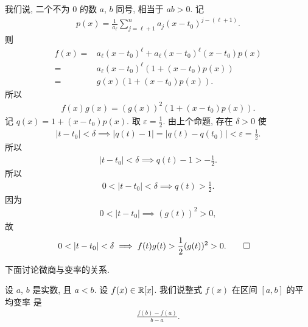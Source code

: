 \begin{pf}
    我们说, 二个不为 $0$ 的数 $a$, $b$ 同号, 相当于 $ab > 0$. 记
    \begin{align*}
        p(x) = \frac{1}{a_\ell} \sum_{j = \ell + 1}^{n} a_j (x - t_0)^{j - (\ell + 1)}.
    \end{align*}
    则
    \begin{align*}
        f(x)
        = {} & a_\ell (x - t_0)^\ell + a_\ell (x - t_0)^{\ell} (x - t_0) p(x) \\
        = {} & a_\ell (x - t_0)^\ell (1 + (x - t_0) p(x))                     \\
        = {} & g(x) (1 + (x - t_0) p(x)).
    \end{align*}
    所以
    \begin{align*}
        f(x) g(x) = (g(x))^2 (1 + (x - t_0) p(x)).
    \end{align*}
    记 $q(x) = 1 + (x - t_0) p(x)$. 取 $\varepsilon = \frac12$. 由上个命题, 存在 $\delta > 0$ 使
    \begin{align*}
        |t - t_0| < \delta \implies |q(t) - 1| = |q(t) - q(t_0)| < \varepsilon = \frac12.
    \end{align*}
    所以
    \begin{align*}
        |t - t_0| < \delta \implies q(t) - 1 > -\frac12.
    \end{align*}
    所以
    \begin{align*}
        0 < |t - t_0| < \delta \implies q(t) > \frac12.
    \end{align*}
    因为
    \begin{align*}
        0 < |t - t_0| \implies (g(t))^2 > 0,
    \end{align*}
    故
    \begin{align*}
         & 0 < |t - t_0| < \delta \implies f(t) g(t) > \frac12 (g(t))^2 > 0. \qedhere
    \end{align*}
\end{pf}

下面讨论微商与变率的关系.

\begin{definition}
    设 $a$, $b$ 是实数, 且 $a < b$. 设 $f(x) \in \mathbb{R}[x]$. 我们说整式 $f(x)$ 在区间 $[a, b]$ 的平均变率  是
    \begin{align*}
        \frac{f(b) - f(a)}{b - a}.
    \end{align*}
\end{definition}

